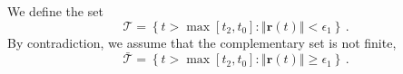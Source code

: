 \documentclass[twoside,11pt,english]{article}
\begin{document}
We define the set 
\[
\mathcal{T}=\left\{ t>\max\left[t_{2},t_{0}\right]:\ensuremath{\left\Vert \mathbf{r}\left(t\right)\right\Vert <\epsilon_{1}}\right\} \,.
\]
By contradiction, we assume that the complementary set is not finite,
\[
\bar{\mathcal{T}}=\left\{ t>\max\left[t_{2},t_{0}\right]:\ensuremath{\left\Vert \mathbf{r}\left(t\right)\right\Vert \geq\epsilon_{1}}\right\} \,.
\]
\end{document}
